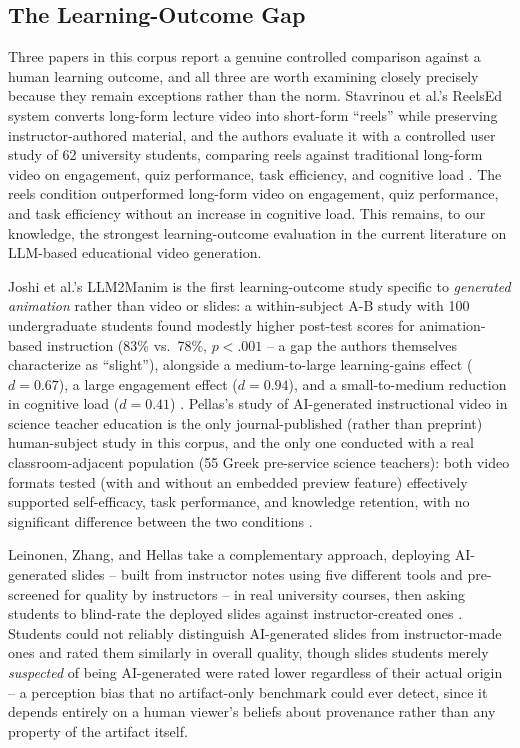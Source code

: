 \documentclass[journal]{IEEEtran}
\begin{document}
\subsection{The Learning-Outcome Gap}

Three papers in this corpus report a genuine controlled comparison against a human learning outcome, and all three are worth examining closely precisely because they remain exceptions rather than the norm. Stavrinou et al.'s ReelsEd system converts long-form lecture video into short-form ``reels'' while preserving instructor-authored material, and the authors evaluate it with a controlled user study of 62 university students, comparing reels against traditional long-form video on engagement, quiz performance, task efficiency, and cognitive load \cite{stavrinou2025reeldeal}. The reels condition outperformed long-form video on engagement, quiz performance, and task efficiency without an increase in cognitive load. This remains, to our knowledge, the strongest learning-outcome evaluation in the current literature on LLM-based educational video generation.

Joshi et al.'s LLM2Manim is the first learning-outcome study specific to \emph{generated animation} rather than video or slides: a within-subject A-B study with 100 undergraduate students found modestly higher post-test scores for animation-based instruction (83\% vs.\ 78\%, $p<.001$ -- a gap the authors themselves characterize as ``slight''), alongside a medium-to-large learning-gains effect ($d=0.67$), a large engagement effect ($d=0.94$), and a small-to-medium reduction in cognitive load ($d=0.41$) \cite{joshi2026llm2manim}. Pellas's study of AI-generated instructional video in science teacher education is the only journal-published (rather than preprint) human-subject study in this corpus, and the only one conducted with a real classroom-adjacent population (55 Greek pre-service science teachers): both video formats tested (with and without an embedded preview feature) effectively supported self-efficacy, task performance, and knowledge retention, with no significant difference between the two conditions \cite{pellas2025aivideos}.

Leinonen, Zhang, and Hellas take a complementary approach, deploying AI-generated slides -- built from instructor notes using five different tools and pre-screened for quality by instructors -- in real university courses, then asking students to blind-rate the deployed slides against instructor-created ones \cite{leinonen2026aislides}. Students could not reliably distinguish AI-generated slides from instructor-made ones and rated them similarly in overall quality, though slides students merely \emph{suspected} of being AI-generated were rated lower regardless of their actual origin -- a perception bias that no artifact-only benchmark could ever detect, since it depends entirely on a human viewer's beliefs about provenance rather than any property of the artifact itself.
\end{document}
